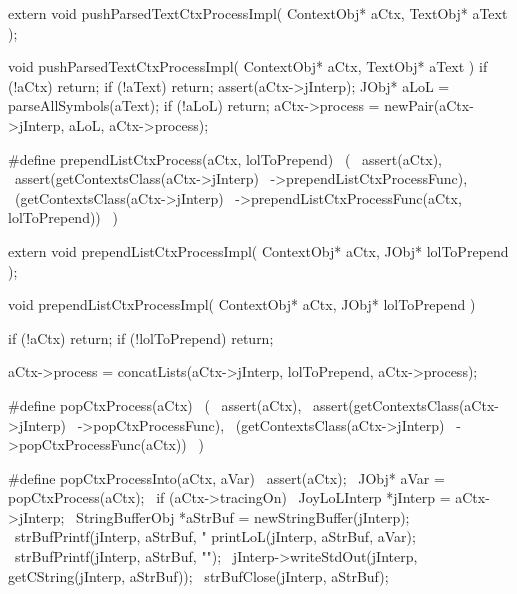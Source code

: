 \startCHeader
extern void pushParsedTextCtxProcessImpl(
  ContextObj* aCtx,
  TextObj* aText
);
\stopCHeader
{}

\startCCode
void pushParsedTextCtxProcessImpl(
  ContextObj* aCtx,
  TextObj* aText
) {
  if (!aCtx) return;
  if (!aText) return;
  assert(aCtx->jInterp);
  JObj* aLoL = parseAllSymbols(aText);
  if (!aLoL) return;
  aCtx->process = newPair(aCtx->jInterp, aLoL, aCtx->process);
}
\stopCCode

\startCHeader
#define prependListCtxProcess(aCtx, lolToPrepend)      \
  (                                                    \
    assert(aCtx),                                      \
    assert(getContextsClass(aCtx->jInterp)             \
      ->prependListCtxProcessFunc),                    \
    (getContextsClass(aCtx->jInterp)                   \
      ->prependListCtxProcessFunc(aCtx, lolToPrepend)) \
  )
\stopCHeader

\setCHeaderStream{private}
\startCHeader
extern void prependListCtxProcessImpl(
  ContextObj* aCtx,
  JObj* lolToPrepend
);
\stopCHeader
\setCHeaderStream{public}

\startCCode
void prependListCtxProcessImpl(
  ContextObj* aCtx,
  JObj* lolToPrepend
) {
  if (!aCtx) return;
  if (!lolToPrepend) return;

  aCtx->process =
    concatLists(aCtx->jInterp, lolToPrepend, aCtx->process);
}
\stopCCode

\startCHeader
#define popCtxProcess(aCtx)                    \
  (                                            \
    assert(aCtx),                              \
    assert(getContextsClass(aCtx->jInterp)     \
      ->popCtxProcessFunc),                    \
    (getContextsClass(aCtx->jInterp)           \
      ->popCtxProcessFunc(aCtx))               \
  )

#define popCtxProcessInto(aCtx, aVar)                           \
assert(aCtx);                                                   \
JObj* aVar = popCtxProcess(aCtx);                               \
if (aCtx->tracingOn) {                                          \
  JoyLoLInterp *jInterp = aCtx->jInterp;                        \
  StringBufferObj *aStrBuf = newStringBuffer(jInterp);          \
  strBufPrintf(jInterp, aStrBuf, "%
  printLoL(jInterp, aStrBuf, aVar);                             \
  strBufPrintf(jInterp, aStrBuf, "\n");                         \
  jInterp->writeStdOut(jInterp, getCString(jInterp, aStrBuf));  \
  strBufClose(jInterp, aStrBuf);                                \
}

